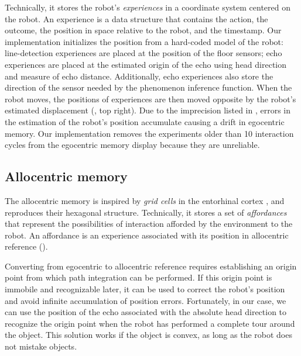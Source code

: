 \documentclass[pmlr]{jmlr}%
\begin{document}
Technically, it stores the robot's \textit{experiences} in a coordinate system centered on the robot.
An experience is a data structure that contains the action, the outcome, the position in space relative to the robot, and the timestamp. 
Our implementation initializes the position from a hard-coded model of the robot: line-detection experiences are placed at the position of the floor sensors; echo experiences are placed at the estimated origin of the echo using head direction and measure of echo distance.
Additionally, echo experiences also store the direction of the sensor needed by the phenomenon inference function.
When the robot moves, the positions of experiences are then moved opposite by the robot's estimated displacement (, top right). 
Due to the imprecision listed in , errors in the estimation of the robot's position accumulate causing a drift in egocentric memory. 
Our implementation removes the experiments older than 10 interaction cycles from the egocentric memory display because they are unreliable.


\subsection{Allocentric memory}

The allocentric memory is inspired by \textit{grid cells} in the entorhinal cortex \citep{grieves_representation_2017}, and reproduces their hexagonal structure. 
Technically, it stores a set of \textit{affordances} that represent the possibilities of interaction afforded by the environment to the robot.  
An affordance is an experience associated with its position in allocentric reference (). 

Converting from egocentric to allocentric reference requires establishing an origin point from which path integration can be performed. 
If this origin point is immobile and recognizable later, it can be used to correct the robot's position and avoid infinite accumulation of position errors.
Fortunately, in our case, we can use the position of the echo associated with the absolute head direction to recognize the origin point when the robot has performed a complete tour around the object.
This solution works if the object is convex, as long as the robot does not mistake objects. 
\end{document}
